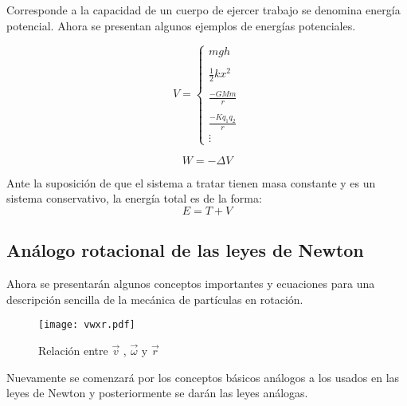 \documentclass[/home/hernan/Documentos/Apuntes_mecanica_teorica/main.tex]{subfiles}
\begin{document}
	\begin{definition} Corresponde a la capacidad de un cuerpo de ejercer trabajo se denomina energía potencial. Ahora se presentan algunos ejemplos de energías potenciales.

		\begin{equation}
			V = \left \{ \begin{matrix}
				mgh\\ 
				\\
				\frac{1}{2}kx^{2} \\
				\\
				\frac{-GMm}{r}\\ 
				\\
				\frac{-Kq_{1}q_{2}}{r}\\ 
				\vdots 
				\end{matrix} \right .
		\end{equation}
	\end{definition}

	\begin{theorem}

		\begin{equation}
			W = - \Delta V
			\label{eq: workV}
		\end{equation}
		
	\end{theorem}

	\begin{definition}
		Ante la suposición de que el sistema a tratar tienen masa constante y es un sistema conservativo, la energía total es de la forma:
		\begin{equation}
			E = T + V
			\label{eq: Energy}
		\end{equation}
		
	\end{definition}

	\subsection{Análogo rotacional de las leyes de Newton}

	Ahora se presentarán algunos conceptos importantes y ecuaciones para una descripción sencilla de la mecánica de partículas en rotación. 	
	\begin{marginfigure}
		\begin{figure}[H]
			\texttt{[image: vwxr.pdf]}
			\caption{Relación entre $\vec{v}$ , $\vec{\omega}$ y $\vec{r}$}
			\label{fig: vwxr}
		\end{figure}
	\end{marginfigure}
	Nuevamente se comenzará por los conceptos básicos análogos a los usados en las leyes de Newton y posteriormente se darán las leyes análogas.
\end{document}
